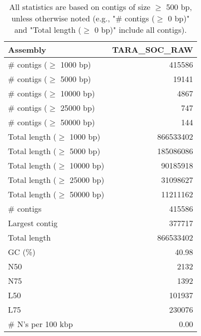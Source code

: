 \documentclass[12pt,a4paper]{article}
\begin{document}
\begin{table}[ht]
\begin{center}
\caption{All statistics are based on contigs of size $\geq$ 500 bp, unless otherwise noted (e.g., "\# contigs ($\geq$ 0 bp)" and "Total length ($\geq$ 0 bp)" include all contigs).}
\begin{tabular}{|l*{1}{|r}|}
\hline
Assembly & TARA\_SOC\_RAW \\ \hline
\# contigs ($\geq$ 1000 bp) & 415586 \\ \hline
\# contigs ($\geq$ 5000 bp) & 19141 \\ \hline
\# contigs ($\geq$ 10000 bp) & 4867 \\ \hline
\# contigs ($\geq$ 25000 bp) & 747 \\ \hline
\# contigs ($\geq$ 50000 bp) & 144 \\ \hline
Total length ($\geq$ 1000 bp) & 866533402 \\ \hline
Total length ($\geq$ 5000 bp) & 185086086 \\ \hline
Total length ($\geq$ 10000 bp) & 90185918 \\ \hline
Total length ($\geq$ 25000 bp) & 31098627 \\ \hline
Total length ($\geq$ 50000 bp) & 11211162 \\ \hline
\# contigs & 415586 \\ \hline
Largest contig & 377717 \\ \hline
Total length & 866533402 \\ \hline
GC (\%) & 40.98 \\ \hline
N50 & 2132 \\ \hline
N75 & 1392 \\ \hline
L50 & 101937 \\ \hline
L75 & 230076 \\ \hline
\# N's per 100 kbp & 0.00 \\ \hline
\end{tabular}
\end{center}
\end{table}
\end{document}
